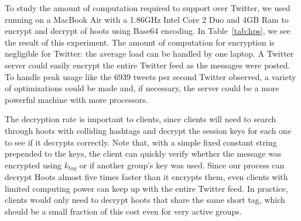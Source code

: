 To study the amount of computation required to support \hoot over
Twitter, we used  running on a MacBook
Air with a 1.86GHz Intel Core 2 Duo and 4GB Ram to encrypt and decrypt
 of hoots using Base64 encoding.
  In
Table~\ref{tab:hps}, we see the result of this experiment. The amount of
computation for encryption is negligible for Twitter: the average load
can be handled by one laptop. A Twitter server could easily encrypt the
entire Twitter feed as the messages were posted. To handle peak usage
like the 6939 tweets per second Twitter observed, a variety of
optimizations could be made and, if necessary, the server could be a
more powerful machine with more processors.

The decryption rate is important to clients, since clients will need to
search through hoots with colliding hashtags and decrypt the session
keys for each one to see if it decrypts correctly. Note that, with a
simple fixed constant string prepended to the keys, the client can
quickly verify whether the message was encrypted using $k_{tag}$ or if
another group's key was used. Since our process can decrypt Hoots almost
five times faster than it encrypts them, even clients with limited
computing power can keep up with the entire Twitter feed. In practice,
clients would only need to decrypt hoots that share the same short tag,
which should be a small fraction of this cost even for very active
groups.




